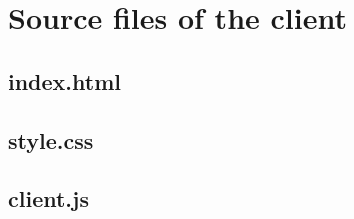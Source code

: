 \chapter{Source files of the client}
\label{app:clientsource}

\section{index.html}
\label{sec:html}

\section{style.css}
\label{sec:css}

\section{client.js}
\label{sec:js}


